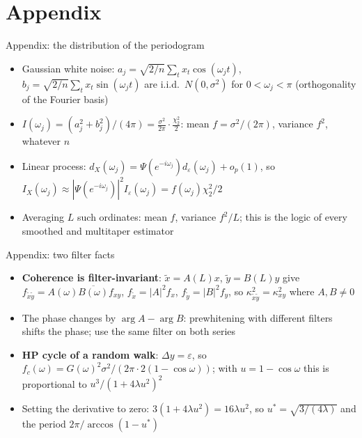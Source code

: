 \section{Appendix}

\begin{frame}{Appendix: the distribution of the periodogram}
\hypertarget{atsapp1}{}
\itemsize{\small}
\begin{itemize}
    \item Gaussian white noise: $a_j = \sqrt{2/n}\sum_tx_t\cos(\omega_jt)$, $b_j = \sqrt{2/n}\sum_tx_t\sin(\omega_jt)$ are i.i.d.\ $N(0, \sigma^2)$ for $0 < \omega_j < \pi$ (orthogonality of the Fourier basis)
    \item $I(\omega_j) = (a_j^2 + b_j^2)/(4\pi) = \frac{\sigma^2}{2\pi}\cdot\frac{\chi^2_2}{2}$: mean $f = \sigma^2/(2\pi)$, variance $f^2$, whatever $n$
    \item Linear process: $d_X(\omega_j) = \Psi(e^{-i\omega_j})d_\varepsilon(\omega_j) + o_p(1)$, so $I_X(\omega_j) \approx |\Psi(e^{-i\omega_j})|^2I_\varepsilon(\omega_j) = f(\omega_j)\chi^2_2/2$
    \item Averaging $L$ such ordinates: mean $f$, variance $f^2/L$; this is the logic of every smoothed and multitaper estimator
\end{itemize}
\end{frame}

\begin{frame}{Appendix: two filter facts}
\hypertarget{atsapp2}{}
\itemsize{\small}
\begin{itemize}
    \item \textbf{Coherence is filter-invariant}: $\tilde x = A(L)x$, $\tilde y = B(L)y$ give $f_{\tilde x\tilde y} = A(\omega)\overline{B(\omega)}f_{xy}$, $f_{\tilde x} = |A|^2f_x$, $f_{\tilde y} = |B|^2f_y$, so $\kappa^2_{\tilde x\tilde y} = \kappa^2_{xy}$ where $A, B \ne 0$
    \item The phase changes by $\arg A - \arg B$: prewhitening with different filters shifts the phase; use the same filter on both series
    \item \textbf{HP cycle of a random walk}: $\Delta y = \varepsilon$, so $f_c(\omega) = G(\omega)^2\sigma^2/(2\pi\cdot2(1 - \cos\omega))$; with $u = 1 - \cos\omega$ this is proportional to $u^3/(1 + 4\lambda u^2)^2$
    \item Setting the derivative to zero: $3(1 + 4\lambda u^2) = 16\lambda u^2$, so $u^* = \sqrt{3/(4\lambda)}$ and the period $2\pi/\arccos(1 - u^*)$
\end{itemize}
\end{frame}


